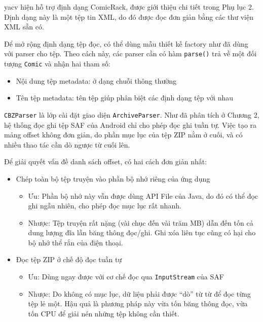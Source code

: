 \documentclass[../../../../thesis]{subfiles}
\begin{document}
yacv hiện hỗ trợ định dạng ComicRack, được giới thiệu chi tiết trong Phụ lục 2.
Định dạng này là một tệp tin XML, do đó được đọc đơn giản bằng các thư viện XML
sẵn có.

Để mở rộng định dạng tệp đọc, có thể dùng mẫu thiết kế factory như đã dùng với
parser cho tệp. Theo cách này, các parser cần có hàm \texttt{parse()} trả về một
đối tượng \texttt{Comic} và nhận hai tham số:

\begin{itemize}
    \item
        Nội dung tệp metadata: ở dạng chuỗi thông thường
    \item
        Tên tệp metadata: tên tệp giúp phân biệt các định dạng tệp với nhau
\end{itemize}

\texttt{CBZParser} là lớp cài đặt giao diện \texttt{ArchiveParser}. Như đã phân
tích ở Chương 2, hệ thống đọc ghi tệp SAF của Android chỉ cho phép đọc ghi tuần
tự. Việc tạo ra mảng offset không đơn giản, do phần mục lục của tệp ZIP nằm ở
cuối, và có nhiều thao tác cần dò ngược từ cuối lên.

Để giải quyết vấn đề danh sách offset, có hai cách đơn giản nhất:

\begin{itemize}
    \item
        Chép toàn bộ tệp truyện vào phần bộ nhớ riêng của ứng dụng

        \begin{itemize}
            \item
                Ưu: Phần bộ nhớ này vẫn được dùng API File của Java, do đó có
                thể đọc ghi ngẫu nhiên, cho phép đọc mục lục rất nhanh.
            \item
                Nhược: Tệp truyện rất nặng (vài chục đến vài trăm MB) dẫn đến
                tốn cả dung lượng đĩa lẫn băng thông đọc/ghi. Ghi xóa liên tục
                cũng có hại cho bộ nhớ thể rắn của điện thoại.
        \end{itemize}
    \item
        Đọc tệp ZIP ở chế độ đọc tuần tự

        \begin{itemize}
            \item
                Ưu: Dùng ngay được với cơ chế đọc qua \texttt{InputStream} của
                SAF
            \item
                Nhược: Do không có mục lục, dữ liệu phải được ``dò'' từ từ để
                đọc từng tệp lẻ một. Hậu quả là phương pháp này vừa tốn băng
                thông đọc, vừa tốn CPU để giải nén những tệp không cần thiết.
        \end{itemize}
\end{itemize}
\end{document}
